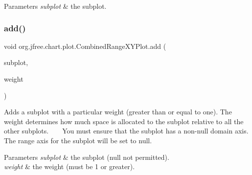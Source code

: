 \begin{DoxyParams}{Parameters}
{\em subplot} & the subplot. \\
\hline
\end{DoxyParams}
\mbox{\label{classorg_1_1jfree_1_1chart_1_1plot_1_1_combined_range_x_y_plot_a22097c8c6e52117556cfe45440fa75e1}} 
\subsubsection{\texorpdfstring{add()}{add()}\hspace{0.1cm}{\footnotesize\ttfamily [2/2]}}
{\footnotesize\ttfamily void org.\+jfree.\+chart.\+plot.\+Combined\+Range\+X\+Y\+Plot.\+add (\begin{DoxyParamCaption}\item[{\mbox{\hyperlink{classorg_1_1jfree_1_1chart_1_1plot_1_1_x_y_plot}{X\+Y\+Plot}}}]{subplot,  }\item[{int}]{weight }\end{DoxyParamCaption})}

Adds a subplot with a particular weight (greater than or equal to one). The weight determines how much space is allocated to the subplot relative to all the other subplots. ~\newline
~\newline
 You must ensure that the subplot has a non-\/null domain axis. The range axis for the subplot will be set to {\ttfamily null}.


\begin{DoxyParams}{Parameters}
{\em subplot} & the subplot ({\ttfamily null} not permitted). \\
\hline
{\em weight} & the weight (must be 1 or greater). \\
\hline
\end{DoxyParams}
\mbox{\label{classorg_1_1jfree_1_1chart_1_1plot_1_1_combined_range_x_y_plot_a2e035de082a4edb84b8bd80a4526d7d1}} 
